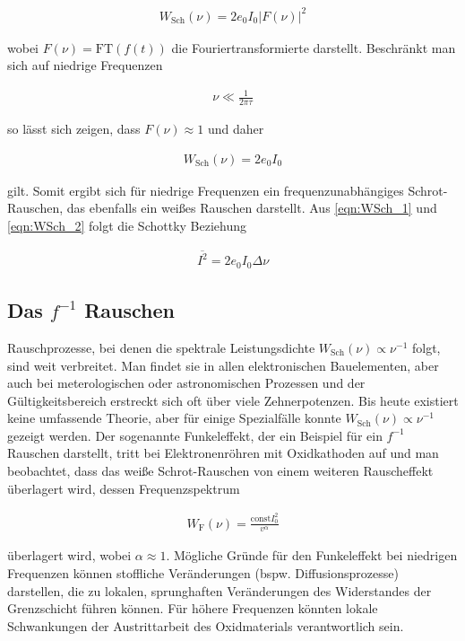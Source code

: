 \begin{align}
W_{\textrm{Sch}}(\nu) = 2 e_0I_0 \vert F(\nu)\vert^2
\end{align}

wobei $F(\nu) = \textrm{FT}\left(f(t)\right)$ die Fouriertransformierte darstellt. Beschränkt man sich auf niedrige Frequenzen

\begin{align}
\nu \ll \frac{1}{2\pi\tau}
\end{align}

so lässt sich zeigen, dass $F(\nu) \approx 1$ und daher

\begin{align}
W_{\textrm{Sch}}(\nu) = 2 e_0I_0 \label{eqn:WSch_2}
\end{align}

gilt. Somit ergibt sich für niedrige Frequenzen ein frequenzunabhängiges Schrot-Rauschen, das ebenfalls ein weißes Rauschen darstellt. Aus \eqref{eqn:WSch_1} und \eqref{eqn:WSch_2} folgt die Schottky Beziehung

\begin{align}
\overline{I^2} = 2 e_0I_0 \Delta\nu \label{eqn:Schottky}
\end{align}

\subsection{Das $f^{-1}$ Rauschen}
Rauschprozesse, bei denen die spektrale Leistungsdichte $W_{\textrm{Sch}}(\nu) \propto \nu^{-1}$ folgt, sind weit verbreitet. Man findet sie in allen elektronischen Bauelementen, aber auch bei meterologischen oder astronomischen Prozessen und der Gültigkeitsbereich erstreckt sich oft über viele Zehnerpotenzen. Bis heute existiert keine umfassende Theorie, aber für einige Spezialfälle konnte $W_{\textrm{Sch}}(\nu) \propto \nu^{-1}$ gezeigt werden. Der sogenannte Funkeleffekt, der ein Beispiel für ein $f^{-1}$ Rauschen darstellt, tritt bei Elektronenröhren mit Oxidkathoden auf und man beobachtet, dass das weiße Schrot-Rauschen von einem weiteren Rauscheffekt überlagert wird, dessen Frequenzspektrum 

\begin{align}
W_{\textrm{F}}(\nu) = \frac{\textrm{const}I_0^2}{v^{\alpha}}\label{eqn:Funkeleffekt}
\end{align}

überlagert wird, wobei $\alpha \approx 1$. Mögliche Gründe für den Funkeleffekt bei niedrigen Frequenzen können stoffliche Veränderungen (bspw. Diffusionsprozesse) darstellen, die zu lokalen, sprunghaften Veränderungen des Widerstandes der Grenzschicht führen können. Für höhere Frequenzen könnten lokale Schwankungen der Austrittarbeit des Oxidmaterials verantwortlich sein.

